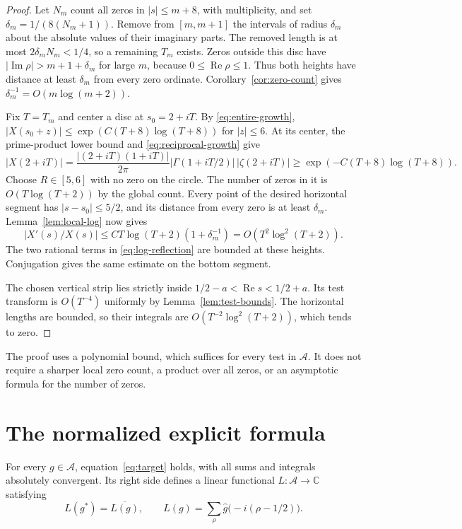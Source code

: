 \documentclass[11pt]{article}
\numberwithin{equation}{section}
\newcommand{\C}{\mathbb C}
\newcommand{\A}{\mathcal A}
\begin{document}
\begin{proof}
Let $N_m$ count all zeros in $|s|\leq m+8$, with multiplicity, and set
$\delta_m=1/(8(N_m+1))$.
Remove from $[m,m+1]$ the intervals of radius $\delta_m$ about the absolute
values of their imaginary parts.
The removed length is at most $2\delta_mN_m<1/4$, so a remaining $T_m$ exists.
Zeros outside this disc have $|\operatorname{Im}\rho|>m+1+\delta_m$
for large $m$, because $0\leq\operatorname{Re}\rho\leq1$.
Thus both heights have distance at least $\delta_m$ from every zero ordinate.
Corollary~\ref{cor:zero-count} gives
$\delta_m^{-1}=O(m\log(m+2))$.

Fix $T=T_m$ and center a disc at $s_0=2+iT$.
By \eqref{eq:entire-growth},
$|X(s_0+z)|\leq\exp(C(T+8)\log(T+8))$ for $|z|\leq6$.
At its center, the prime-product lower bound and
\eqref{eq:reciprocal-growth} give
\[
 |X(2+iT)|
 =\frac{|(2+iT)(1+iT)|}{2\pi}
       |\Gamma(1+iT/2)|\,|\zeta(2+iT)|
 \geq\exp(-C(T+8)\log(T+8)).
\]
Choose $R\in[5,6]$ with no zero on the circle.
The number of zeros in it is $O(T\log(T+2))$ by the global count.
Every point of the desired horizontal segment has $|s-s_0|\leq5/2$,
and its distance from every zero is at least $\delta_m$.
Lemma~\ref{lem:local-log} now gives
\[
 |X'(s)/X(s)|
 \leq C T\log(T+2)(1+\delta_m^{-1})
 =O(T^2\log^2(T+2)).
\]
The two rational terms in \eqref{eq:log-reflection} are bounded at these
heights.  Conjugation gives the same estimate on the bottom segment.

The chosen vertical strip lies strictly inside
$1/2-a<\operatorname{Re}s<1/2+a$.
Its test transform is $O(T^{-4})$ uniformly by
Lemma~\ref{lem:test-bounds}.
The horizontal lengths are bounded, so their integrals are
$O(T^{-2}\log^2(T+2))$, which tends to zero.
\end{proof}

The proof uses a polynomial bound, which suffices for every test in $\A$.
It does not require a sharper local zero count, a product over all zeros,
or an asymptotic formula for the number of zeros.

\section{The normalized explicit formula}
\label{sec:formula}

\begin{theorem}
\label{thm:explicit}
For every $g\in\A$, equation~\eqref{eq:target} holds, with all sums and
integrals absolutely convergent.
Its right side defines a linear functional $L:\A\to\C$ satisfying
\begin{equation}
 L(g^*)=\overline{L(g)},\qquad
 L(g)=\sum_\rho\widehat g\bigl(-i(\rho-1/2)\bigr).
 \label{eq:functional}
\end{equation}
\end{theorem}
\end{document}
